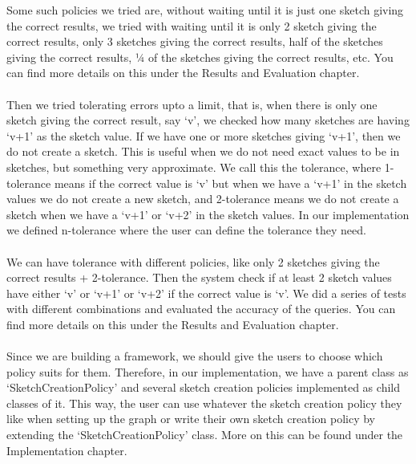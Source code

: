 \documentclass[12pt]{report}
\numberwithin{figure}{section}
\numberwithin{table}{section}
\begin{document}
Some such policies we tried are, without waiting until it is just one sketch giving the correct results, we tried with waiting until it is only 2 sketch giving the correct results, only 3 sketches giving the correct results, half of the sketches giving the correct results, ¼ of the sketches giving the correct results, etc.  You can find more details on this under the Results and Evaluation chapter.

\paragraph{}

Then we tried tolerating errors upto a limit, that is, when there is only one sketch giving the correct result, say ‘v’, we checked how many sketches are having ‘v+1’ as the sketch value. If we have one or more sketches giving ‘v+1’, then we do not create a sketch. This is useful when we do not need exact values to be in sketches, but something very approximate. We call this the tolerance, where 1-tolerance means if the correct value is ‘v’ but when we have a ‘v+1’ in the sketch values we do not create a new sketch, and 2-tolerance means we do not create a sketch when we have a ‘v+1’ or ‘v+2’ in the sketch values. In our implementation we defined n-tolerance where the user can define the tolerance they need. 

\paragraph{}

We can have tolerance with different policies, like  only 2 sketches giving the correct results + 2-tolerance. Then the system check if at least 2 sketch values have either ‘v’ or ‘v+1’ or ‘v+2’ if the correct value is ‘v’. We did a series of tests with different combinations and evaluated the accuracy of the queries. You can find more details on this under the Results and Evaluation chapter.

\paragraph{}

Since we are building a framework, we should give the users to choose which policy suits for them. Therefore, in our implementation, we have a parent class as ‘SketchCreationPolicy’ and several sketch creation policies implemented as child classes of it. This way, the user can use whatever the sketch creation policy they like when setting up the graph or write their own sketch creation policy by extending the ‘SketchCreationPolicy’ class. More on this can be found under the Implementation chapter.
\end{document}
